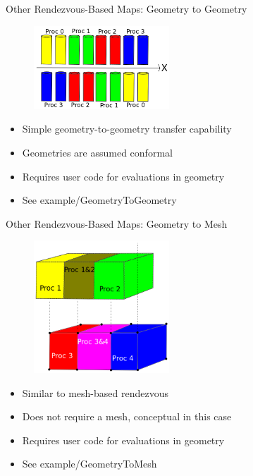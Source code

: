 \documentclass{beamer}
\begin{document}
\begin{frame}{Other Rendezvous-Based Maps: Geometry to Geometry}

  \begin{figure}
    \centering
    \includegraphics[width=2in]{volumetovolume.png}
  \end{figure}

  \begin{itemize}
  \item Simple geometry-to-geometry transfer capability
    \medskip
  \item Geometries are assumed conformal
    \medskip
  \item Requires user code for evaluations in geometry
    \medskip
  \item See example/GeometryToGeometry
  \end{itemize}

\end{frame}

\begin{frame}{Other Rendezvous-Based Maps: Geometry to Mesh}

  \begin{figure}
    \centering
    \includegraphics[width=2in]{volumetomesh.png}
  \end{figure}

  \begin{itemize}
  \item Similar to mesh-based rendezvous
    \medskip
  \item Does not require a mesh, conceptual in this case
    \medskip
  \item Requires user code for evaluations in geometry
    \medskip
  \item See example/GeometryToMesh
  \end{itemize}

\end{frame}
\end{document}
